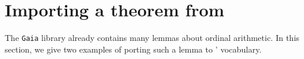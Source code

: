 


  
 







\section{Importing a theorem from \gaia}
\label{sect:gaia2hydra}

The \texttt{Gaia} library already contains many lemmas about
ordinal arithmetic. In this section, we give two examples of
porting such a lemma to \HydrasLib' vocabulary.

